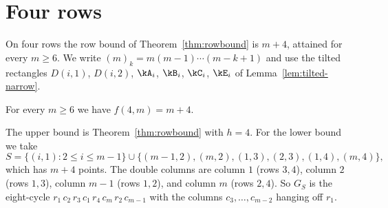 \section{Four rows}\label{sec:four}

On four rows the row bound of Theorem~\ref{thm:rowbound} is $m+4$, attained for every $m\ge6$. We write $(m)_k=m(m-1)\cdots(m-k+1)$ and use the tilted rectangles $D(i,1)$, $D(i,2)$, $\kA_i$, $\kB_i$, $\kC_i$, $\kE_i$ of Lemma~\ref{lem:tilted-narrow}.

\begin{theorem}\label{thm:fourvalue}
For every $m\ge6$ we have $f(4,m)=m+4$.
\end{theorem}

The upper bound is Theorem~\ref{thm:rowbound} with $h=4$. For the lower bound we take
\begin{equation}\label{eq:fourS}
S=\{(i,1):2\le i\le m-1\}\cup\{(m-1,2),(m,2),(1,3),(2,3),(1,4),(m,4)\},
\end{equation}
which has $m+4$ points. The double columns are column $1$ (rows $3,4$), column $2$ (rows $1,3$), column $m-1$ (rows $1,2$), and column $m$ (rows $2,4$). So $G_S$ is the eight-cycle $r_1\,c_2\,r_3\,c_1\,r_4\,c_m\,r_2\,c_{m-1}$ with the columns $c_3,\ldots,c_{m-2}$ hanging off $r_1$.

